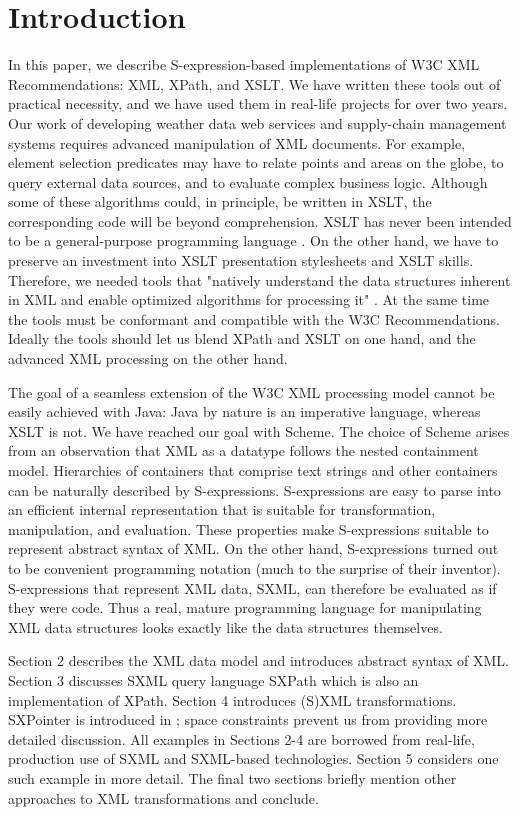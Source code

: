 \documentclass[10pt]{llncs}
\begin{document}
\section{Introduction}
In this paper, we describe S-expression-based implementations of
W3C XML Recommendations: XML, XPath, and XSLT. We have written these
tools out of practical necessity, and we have used them in real-life
projects for over two years. Our work of developing weather data web
services and supply-chain management systems requires advanced
manipulation of XML documents. For example, element selection
predicates may have to relate points and areas on the globe, to query
external data sources, and to evaluate complex business logic. Although
some of these algorithms could, in principle, be written in XSLT, the
corresponding code will be beyond comprehension. XSLT has never been
intended to be a general-purpose programming language \cite{XSLT}. On the other hand, we have to preserve an investment into XSLT
presentation stylesheets and XSLT skills. Therefore, we needed tools
that "natively understand the data structures inherent in XML and
enable optimized algorithms for processing it" \cite{Bosworth}. At the same time the tools must be conformant and compatible with
the W3C Recommendations. Ideally the tools should let us blend XPath
and XSLT on one hand, and the advanced XML processing on the other
hand.

The goal of a seamless extension of the W3C XML processing model
cannot be easily achieved with Java: Java by nature is an imperative
language, whereas XSLT is not. We have reached our goal with
Scheme. The choice of Scheme arises from an observation that XML as a
datatype follows the nested containment model. Hierarchies of
containers that comprise text strings and other containers can be
naturally described by S-expressions.  S-expressions are easy to parse
into an efficient internal representation that is suitable for
transformation, manipulation, and evaluation.  These properties make
S-expressions suitable to represent abstract syntax of XML.  On the
other hand, S-expressions turned out to be convenient programming
notation (much to the surprise of their inventor). S-expressions that
represent XML data, SXML, can therefore be evaluated as if they were
code. Thus a real, mature programming language for manipulating XML
data structures looks exactly like the data structures themselves.

Section 2 describes the XML data model and introduces abstract
syntax of XML. Section 3 discusses SXML query language SXPath which is
also an implementation of XPath. Section 4 introduces (S)XML
transformations. SXPointer is introduced in \cite{SXPointer};
space constraints prevent us from providing more detailed
discussion. All examples in Sections 2-4 are borrowed from real-life,
production use of SXML and SXML-based technologies. Section 5
considers one such example in more detail. The final two sections
briefly mention other approaches to XML transformations and
conclude.
\end{document}
